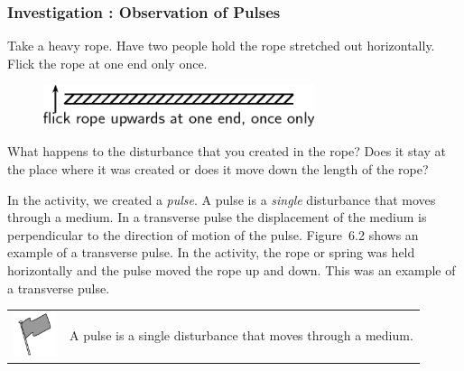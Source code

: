             \subsubsection{  Investigation : Observation of Pulses }
            \nopagebreak
      \label{m38801*id312873}Take a heavy rope. Have two people hold the rope stretched out horizontally. Flick the rope at one end only once.\par 
      \label{m38801*id312879}
    \setcounter{subfigure}{0}
	\begin{figure}[H] %
    \begin{center}
    \label{m38801*id312882!!!underscore!!!media}\label{m38801*id312882!!!underscore!!!printimage}\includegraphics[width=300px]{col11305.imgs/m38801_PG10C4_001.png} %
      \vspace{2pt}
    \vspace{.1in}
    \end{center}
 \end{figure}       
      \par 
      \label{m38801*id312888}What happens to the disturbance that you created in the rope? Does it stay at the place where it was created or does it move down the length of the rope? \par 
      \label{m38801*id312898}In the activity, we created a \textsl{pulse}. A pulse is a \textsl{single} disturbance that moves through a medium. In a transverse pulse the displacement of the medium is perpendicular to the direction of motion of the pulse. Figure~6.2 shows an example of a transverse pulse. In the activity, the rope or spring was held horizontally and the pulse moved the rope up and down. This was an example of a transverse pulse.\par 
\label{m38801*fhsst!!!underscore!!!id71}\begin{definition}
	  \begin{tabular*}{15 cm}{m{15 mm}m{}}
	\hspace*{-50pt}  \includegraphics[width=0.5in]{col11305.imgs/psflag2.png}   & \Definition{   \label{id2434846}\textbf{ Pulse }} { \label{m38801*meaningfhsst!!!underscore!!!id71}
      \label{m38801*id312926}A pulse is a single disturbance that moves through a medium. \par 
       } 
      \end{tabular*}
      \end{definition}

